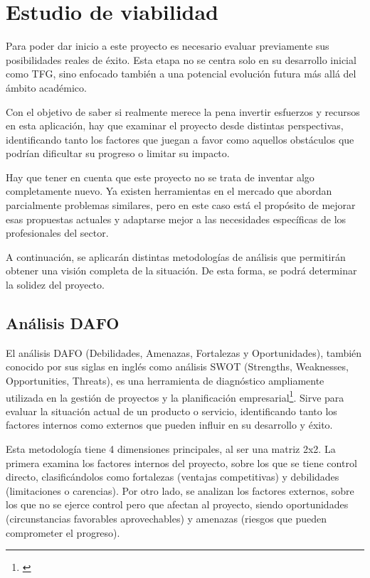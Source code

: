 \chapter{Estudio de viabilidad}
    Para poder dar inicio a este proyecto es necesario evaluar previamente sus posibilidades reales de éxito. Esta etapa no se centra solo en su desarrollo inicial como TFG, sino enfocado también a una potencial evolución futura más allá del ámbito académico.

   Con el objetivo de saber si realmente merece la pena invertir esfuerzos y recursos en esta aplicación, hay que examinar el proyecto desde distintas perspectivas, identificando tanto los factores que juegan a favor como aquellos obstáculos que podrían dificultar su progreso o limitar su impacto.

   Hay que tener en cuenta que este proyecto no se trata de inventar algo completamente nuevo. Ya existen herramientas en el mercado que abordan parcialmente problemas similares, pero en este caso está el propósito de mejorar esas propuestas actuales y adaptarse mejor a las necesidades específicas de los profesionales del sector.

   A continuación, se aplicarán distintas metodologías de análisis que permitirán obtener una visión completa de la situación. De esta forma, se podrá determinar la solidez del proyecto.

  
\section{Análisis DAFO} 

    El análisis DAFO (Debilidades, Amenazas, Fortalezas y Oportunidades), también conocido por sus siglas en inglés como análisis SWOT (Strengths, Weaknesses, Opportunities, Threats), es una herramienta de diagnóstico ampliamente utilizada en la gestión de proyectos y la planificación empresarial\footnote{\cite{weihrich1982daws}}. Sirve para evaluar la situación actual de un producto o servicio, identificando tanto los factores internos como externos que pueden influir en su desarrollo y éxito.

    Esta metodología tiene 4 dimensiones principales, al ser una matriz 2x2. La primera examina los factores internos del proyecto, sobre los que se tiene control directo, clasificándolos como fortalezas (ventajas competitivas) y debilidades (limitaciones o carencias). Por otro lado, se analizan los factores externos, sobre los que no se ejerce control pero que afectan al proyecto, siendo oportunidades (circunstancias favorables aprovechables) y amenazas (riesgos que pueden comprometer el progreso).


